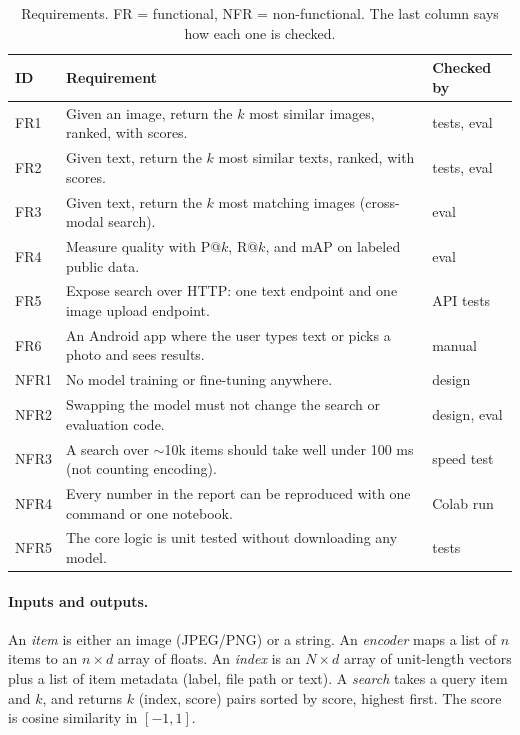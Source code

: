 \documentclass{article}
\begin{document}
\begin{table}[h]
\centering\small
\caption{Requirements. FR = functional, NFR = non-functional. The last column says how each one is checked.}
\label{tab:req}
\begin{tabular}{@{}lp{7.6cm}l@{}}
\toprule
ID & Requirement & Checked by \\
\midrule
FR1 & Given an image, return the $k$ most similar images, ranked, with scores. & tests, eval \\
FR2 & Given text, return the $k$ most similar texts, ranked, with scores. & tests, eval \\
FR3 & Given text, return the $k$ most matching images (cross-modal search). & eval \\
FR4 & Measure quality with P@$k$, R@$k$, and mAP on labeled public data. & eval \\
FR5 & Expose search over HTTP: one text endpoint and one image upload endpoint. & API tests \\
FR6 & An Android app where the user types text or picks a photo and sees results. & manual \\
\midrule
NFR1 & No model training or fine-tuning anywhere. & design \\
NFR2 & Swapping the model must not change the search or evaluation code. & design, eval \\
NFR3 & A search over $\sim$10k items should take well under 100 ms (not counting encoding). & speed test \\
NFR4 & Every number in the report can be reproduced with one command or one notebook. & Colab run \\
NFR5 & The core logic is unit tested without downloading any model. & tests \\
\bottomrule
\end{tabular}
\end{table}

\paragraph{Inputs and outputs.} An \emph{item} is either an image (JPEG/PNG) or a string. An \emph{encoder} maps a list of $n$ items to an $n\times d$ array of floats. An \emph{index} is an $N\times d$ array of unit-length vectors plus a list of item metadata (label, file path or text). A \emph{search} takes a query item and $k$, and returns $k$ (index, score) pairs sorted by score, highest first. The score is cosine similarity in $[-1, 1]$.
\end{document}
